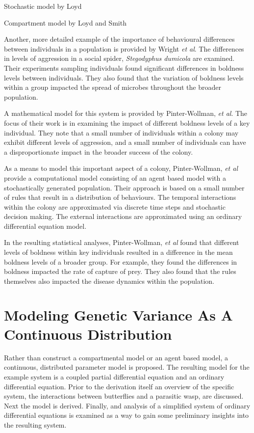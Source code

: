 \documentclass[12pt]{article}
\begin{document}
Stochastic model by Loyd

Compartment model by Loyd and Smith

Another, more detailed example of the importance of behavioural
differences between individuals in a population is provided by Wright
\textit{et al}\cite{WRIGHT2016175}. The differences in levels of
aggression in a social spider, \textit{Stegodyphus dumicola} are
examined. Their experiments sampling individuals found significant
differences in boldness levels between individuals. They also found
that the variation of boldness levels within a group impacted the
spread of microbes throughout the broader population.

A mathematical model for this system is provided by Pinter-Wollman,
\textit{et al}\cite{doi:10.1086/687235}. The focus of their work is in
examining the impact of different boldness levels of a key individual.
They note that a small number of individuals within a colony may
exhibit different levels of aggression, and a small number of
individuals can have a disproportionate impact in the broader success
of the colony.

As a means to model this important aspect of a colony, Pinter-Wollman,
\textit{et al}\cite{doi:10.1086/687235} provide a computational model
consisting of an agent based model with a stochastically generated
population. Their approach is based on a small number of rules that
result in a distribution of behaviours. The temporal interactions
within the colony are approximated via discrete time steps and
stochastic decision making. The external interactions are approximated
using an ordinary differential equation model.

In the resulting statistical analyses, Pinter-Wollman, \textit{et
  al}\cite{doi:10.1086/687235} found that different levels of boldness
within key individuals resulted in a difference in the mean boldness
levels of a broader group. For example, they found the differences in
boldness impacted the rate of capture of prey. They also found that
the rules themselves also impacted the disease dynamics within the
population.


\section{Modeling Genetic Variance As A Continuous Distribution}

Rather than construct a compartmental model or an agent based model, a
continuous, distributed parameter model is proposed. The resulting
model for the example system is a coupled partial differential
equation and an ordinary differential equation. Prior to the
derivation itself an overview of the specific system, the interactions
between butterflies and a parasitic wasp, are discussed. Next the
model is derived. Finally, and analysis of a simplified system of
ordinary differential equations is examined as a way to gain some
preliminary insights into the resulting system.
\end{document}
